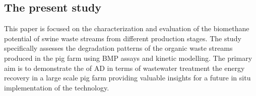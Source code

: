 \subsection{The present study}
This paper is focused on the characterization and evaluation of the biomethane potential of swine waste streams from different production stages. The study specifically assesses the degradation patterns of the organic waste streams produced in the pig farm using BMP assays and kinetic modelling. The primary aim is to demonstrate the  of AD in terms of wastewater treatment the energy recovery in a large scale pig farm providing valuable insights for a future in situ implementation of the technology.